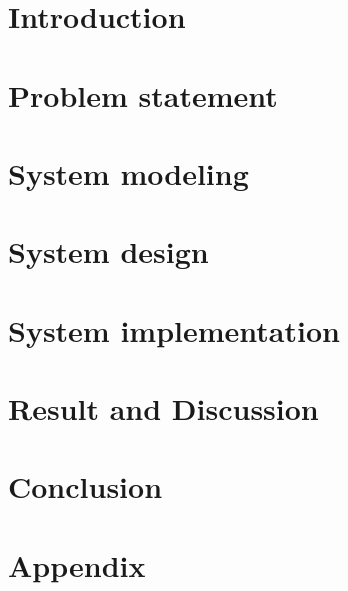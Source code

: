 \documentclass[11pt,a4paper,fleqn]{article}
\begin{document}

\newpage





\tableofcontents
\newpage


\section{Introduction}%
\label{sec:introduction}


\section{Problem statement}%
\label{sec:problem_statement}


\section{System modeling}%
\label{sec:system_modeling}


\section{System design}%
\label{sec:system_design}


\section{System implementation}%
\label{sec:system_implementation}


\section{Result and Discussion}
\label{sec:result_and_discussion}


\section{Conclusion}%
\label{sec:conclusion}



\newpage
{}


\section{Appendix}%
\label{sec:appendix}

\end{document}
